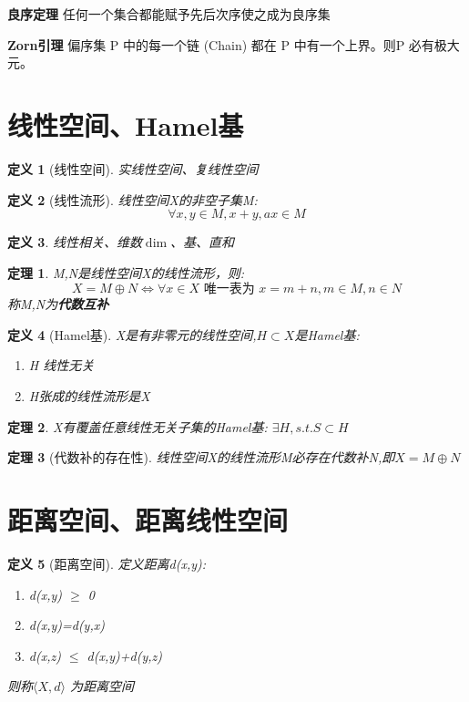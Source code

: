 \documentclass[12pt, a4paper, oneside, fontset=windows]{ctexbook}
\newtheorem{theorem}{定理}[section]
\newtheorem{definition}{定义}[section]
\begin{document}
    \begin{tcolorbox}
        {\bf 良序定理} 任何一个集合都能赋予先后次序使之成为良序集
    \end{tcolorbox}

    \begin{tcolorbox}
        {\bf Zorn引理}  偏序集 P 中的每一个链 (Chain) 都在 P 中有一个上界。则P 必有极大元。
    \end{tcolorbox}

    \section{线性空间、Hamel基}
    \begin{definition}[线性空间]
        实线性空间、复线性空间
    \end{definition}
    \begin{definition}[线性流形]
        线性空间X的非空子集M:\[\forall x,y \in M , x + y,ax \in M\]
    \end{definition}
    \begin{definition}
        线性相关、维数$\dim $、基、直和
    \end{definition}

    \begin{theorem}
        M,N是线性空间X的线性流形，则:\[X=M\oplus N \Leftrightarrow \forall x \in X \text{ 唯一表为 } x=m+n ,m\in M,n \in N\]
        称M,N为\textbf{代数互补}
    \end{theorem}

    \begin{definition}[Hamel基]
        X是有非零元的线性空间,$H \subset X$是Hamel基:
        \begin{enumerate}
            \item H 线性无关
            \item H张成的线性流形是X
        \end{enumerate}
    \end{definition}
    \begin{theorem}
        X有覆盖任意线性无关子集的Hamel基: $\exists H,s.t. S \subset H$
    \end{theorem}

    \begin{theorem}[代数补的存在性]
        线性空间X的线性流形M必存在代数补N,即$X = M \oplus N$
    \end{theorem}

    \section{距离空间、距离线性空间}
    \begin{definition}[距离空间]
        定义距离d(x,y):
        \begin{enumerate}
            \item d(x,y) $\ge$ 0
            \item d(x,y)=d(y,x)
            \item d(x,z) $\le$ d(x,y)+d(y,z)
        \end{enumerate}
        则称$\langle X,d\rangle$ 为距离空间 
    \end{definition}
\end{document}
